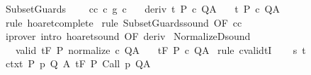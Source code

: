 \begin{isabellebody}
{\isafoldproof}%
%
\isadelimproof
\isanewline
%
\endisadelimproof
\isanewline
{}\isamarkupfalse%
\ SubsetGuards{\isacharcolon}\ \isanewline
\ \ \ c{\isacharunderscore}c{\isacharprime}{\isacharcolon}\ {\isachardoublequoteopen}c\ {\isasymsubseteq}\isactrlsub g\ c{\isacharprime}{\isachardoublequoteclose}\isanewline
\ \ \ deriv{\isacharcolon}\ {\isachardoublequoteopen}{\isasymGamma}{\isacharcomma}{\isasymTheta}{\isasymturnstile}\isactrlsub t\isactrlbsub {\isacharslash}{\isacharbraceleft}{\isacharbraceright}\isactrlesub \ P\ c{\isacharprime}\ Q{\isacharcomma}A{\isachardoublequoteclose}\isanewline
\ \ \ {\isachardoublequoteopen}{\isasymGamma}{\isacharcomma}{\isasymTheta}{\isasymturnstile}\isactrlsub t\isactrlbsub {\isacharslash}{\isacharbraceleft}{\isacharbraceright}\isactrlesub \ P\ c\ Q{\isacharcomma}A{\isachardoublequoteclose}\isanewline
%
\isadelimproof
%
\endisadelimproof
%
\isatagproof
{}\isamarkupfalse%
\ {\isacharparenleft}rule\ hoaret{\isacharunderscore}complete{\isacharprime}{\isacharparenright}\isanewline
{}\isamarkupfalse%
\ {\isacharparenleft}rule\ SubsetGuards{\isacharunderscore}sound\ {\isacharbrackleft}OF\ c{\isacharunderscore}c{\isacharprime}{\isacharbrackright}{\isacharparenright}\isanewline
{}\isamarkupfalse%
\ {\isacharparenleft}iprover\ intro{\isacharcolon}\ hoaret{\isacharunderscore}sound\ {\isacharbrackleft}OF\ deriv{\isacharbrackright}{\isacharparenright}\isanewline
{}\isamarkupfalse%
%
\endisatagproof
{\isafoldproof}%
%
\isadelimproof
\isanewline
%
\endisadelimproof
\isanewline
{}\isamarkupfalse%
\ NormalizeD{\isacharunderscore}sound{\isacharcolon}\ \isanewline
\ \ \ valid{\isacharcolon}\ {\isachardoublequoteopen}{\isasymGamma}{\isacharcomma}{\isasymTheta}{\isasymTurnstile}\isactrlsub t\isactrlbsub {\isacharslash}F\isactrlesub \ P\ {\isacharparenleft}normalize\ c{\isacharparenright}\ Q{\isacharcomma}A{\isachardoublequoteclose}\isanewline
\ \ \ {\isachardoublequoteopen}{\isasymGamma}{\isacharcomma}{\isasymTheta}{\isasymTurnstile}\isactrlsub t\isactrlbsub {\isacharslash}F\isactrlesub \ P\ c\ Q{\isacharcomma}A{\isachardoublequoteclose}\isanewline
%
\isadelimproof
%
\endisadelimproof
%
\isatagproof
{}\isamarkupfalse%
\ {\isacharparenleft}rule\ cvalidtI{\isacharparenright}\isanewline
\ \ \isamarkupfalse%
\ s\ t\isanewline
\ \ \isamarkupfalse%
\ ctxt{\isacharcolon}\ {\isachardoublequoteopen}{\isasymforall}{\isacharparenleft}P{\isacharcomma}\ p{\isacharcomma}\ Q{\isacharcomma}\ A{\isacharparenright}{\isasymin}{\isasymTheta}{\isachardot}\ {\isasymGamma}{\isasymTurnstile}\isactrlsub t\isactrlbsub {\isacharslash}F\isactrlesub \ P\ {\isacharparenleft}Call\ p{\isacharparenright}\ Q{\isacharcomma}A{\isachardoublequoteclose}\ \isanewline

\end{isabellebody}
